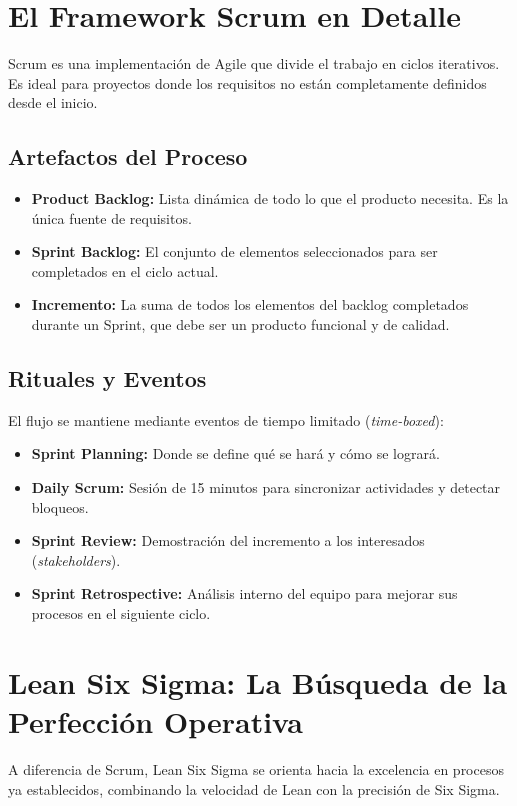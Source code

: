 \documentclass[runningheads]{llncs}
\begin{document}
\section{El Framework Scrum en Detalle}
Scrum es una implementación de Agile que divide el trabajo en ciclos iterativos. Es ideal para proyectos donde los requisitos no están completamente definidos desde el inicio.

\subsection{Artefactos del Proceso}
\begin{itemize}
    \item \textbf{Product Backlog:} Lista dinámica de todo lo que el producto necesita. Es la única fuente de requisitos.
    \item \textbf{Sprint Backlog:} El conjunto de elementos seleccionados para ser completados en el ciclo actual.
    \item \textbf{Incremento:} La suma de todos los elementos del backlog completados durante un Sprint, que debe ser un producto funcional y de calidad.
\end{itemize}

\subsection{Rituales y Eventos}
El flujo se mantiene mediante eventos de tiempo limitado (\textit{time-boxed}):
\begin{itemize}
    \item \textbf{Sprint Planning:} Donde se define qué se hará y cómo se logrará.
    \item \textbf{Daily Scrum:} Sesión de 15 minutos para sincronizar actividades y detectar bloqueos.
    \item \textbf{Sprint Review:} Demostración del incremento a los interesados (\textit{stakeholders}).
    \item \textbf{Sprint Retrospective:} Análisis interno del equipo para mejorar sus procesos en el siguiente ciclo.
\end{itemize}

\section{Lean Six Sigma: La Búsqueda de la Perfección Operativa}
A diferencia de Scrum, Lean Six Sigma se orienta hacia la excelencia en procesos ya establecidos, combinando la velocidad de Lean con la precisión de Six Sigma.
\end{document}
